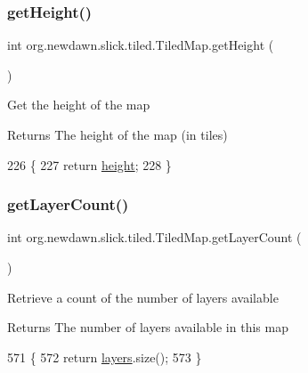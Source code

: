 \subsubsection{\texorpdfstring{get\+Height()}{getHeight()}}
{\footnotesize\ttfamily int org.\+newdawn.\+slick.\+tiled.\+Tiled\+Map.\+get\+Height (\begin{DoxyParamCaption}{ }\end{DoxyParamCaption})\hspace{0.3cm}{\ttfamily [inline]}}

Get the height of the map

\begin{DoxyReturn}{Returns}
The height of the map (in tiles) 
\end{DoxyReturn}

\begin{DoxyCode}
226                            \{
227         \textcolor{keywordflow}{return} \mbox{\hyperlink{classorg_1_1newdawn_1_1slick_1_1tiled_1_1_tiled_map_a5f9af8e6eb820e35327c4290d14c0bd7}{height}};
228     \}
\end{DoxyCode}
\mbox{\label{classorg_1_1newdawn_1_1slick_1_1tiled_1_1_tiled_map_a0d39d942ba61034ae79dfa9cec23905c}} 
\subsubsection{\texorpdfstring{get\+Layer\+Count()}{getLayerCount()}}
{\footnotesize\ttfamily int org.\+newdawn.\+slick.\+tiled.\+Tiled\+Map.\+get\+Layer\+Count (\begin{DoxyParamCaption}{ }\end{DoxyParamCaption})\hspace{0.3cm}{\ttfamily [inline]}}

Retrieve a count of the number of layers available

\begin{DoxyReturn}{Returns}
The number of layers available in this map 
\end{DoxyReturn}

\begin{DoxyCode}
571                                \{
572         \textcolor{keywordflow}{return} \mbox{\hyperlink{classorg_1_1newdawn_1_1slick_1_1tiled_1_1_tiled_map_a33061324d017a4cd8f41d04e0c60ac27}{layers}}.size();
573     \}
\end{DoxyCode}
\mbox{\label{classorg_1_1newdawn_1_1slick_1_1tiled_1_1_tiled_map_a70c72f5ad1f0fb784c6bfd0dc71d0608}} 
